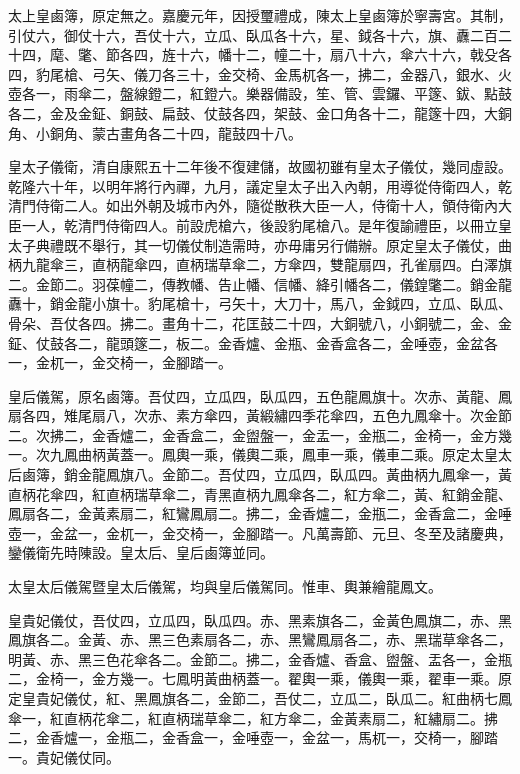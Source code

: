 \begin{pinyinscope}
太上皇鹵簿，原定無之。嘉慶元年，因授璽禮成，陳太上皇鹵簿於寧壽宮。其制，引仗六，御仗十六，吾仗十六，立瓜、臥瓜各十六，星、鉞各十六，旗、纛二百二十四，麾、氅、節各四，旌十六，幡十二，幢二十，扇八十六，傘六十六，戟殳各四，豹尾槍、弓矢、儀刀各三十，金交椅、金馬杌各一，拂二，金器八，銀水、火壺各一，雨傘二，盤線鐙二，紅鐙六。樂器備設，笙、管、雲鑼、平篴、鈸、點鼓各二，金及金鉦、銅鼓、扁鼓、仗鼓各四，架鼓、金口角各十二，龍篴十四，大銅角、小銅角、蒙古畫角各二十四，龍鼓四十八。

皇太子儀衛，清自康熙五十二年後不復建儲，故國初雖有皇太子儀仗，幾同虛設。乾隆六十年，以明年將行內禪，九月，議定皇太子出入內朝，用導從侍衛四人，乾清門侍衛二人。如出外朝及城市內外，隨從散秩大臣一人，侍衛十人，領侍衛內大臣一人，乾清門侍衛四人。前設虎槍六，後設豹尾槍八。是年復諭禮臣，以冊立皇太子典禮既不舉行，其一切儀仗制造需時，亦毋庸另行備辦。原定皇太子儀仗，曲柄九龍傘三，直柄龍傘四，直柄瑞草傘二，方傘四，雙龍扇四，孔雀扇四。白澤旗二。金節二。羽葆幢二，傳教幡、告止幡、信幡、絳引幡各二，儀鍠氅二。銷金龍纛十，銷金龍小旗十。豹尾槍十，弓矢十，大刀十，馬八，金鉞四，立瓜、臥瓜、骨朵、吾仗各四。拂二。畫角十二，花匡鼓二十四，大銅號八，小銅號二，金、金鉦、仗鼓各二，龍頭篴二，板二。金香爐、金瓶、金香盒各二，金唾壺，金盆各一，金杌一，金交椅一，金腳踏一。

皇后儀駕，原名鹵簿。吾仗四，立瓜四，臥瓜四，五色龍鳳旗十。次赤、黃龍、鳳扇各四，雉尾扇八，次赤、素方傘四，黃緞繡四季花傘四，五色九鳳傘十。次金節二。次拂二，金香爐二，金香盒二，金盥盤一，金盂一，金瓶二，金椅一，金方幾一。次九鳳曲柄黃蓋一。鳳輿一乘，儀輿二乘，鳳車一乘，儀車二乘。原定太皇太后鹵簿，銷金龍鳳旗八。金節二。吾仗四，立瓜四，臥瓜四。黃曲柄九鳳傘一，黃直柄花傘四，紅直柄瑞草傘二，青黑直柄九鳳傘各二，紅方傘二，黃、紅銷金龍、鳳扇各二，金黃素扇二，紅鸞鳳扇二。拂二，金香爐二，金瓶二，金香盒二，金唾壺一，金盆一，金杌一，金交椅一，金腳踏一。凡萬壽節、元旦、冬至及諸慶典，鑾儀衛先時陳設。皇太后、皇后鹵簿並同。

太皇太后儀駕暨皇太后儀駕，均與皇后儀駕同。惟車、輿兼繪龍鳳文。

皇貴妃儀仗，吾仗四，立瓜四，臥瓜四。赤、黑素旗各二，金黃色鳳旗二，赤、黑鳳旗各二。金黃、赤、黑三色素扇各二，赤、黑鸞鳳扇各二，赤、黑瑞草傘各二，明黃、赤、黑三色花傘各二。金節二。拂二，金香爐、香盒、盥盤、盂各一，金瓶二，金椅一，金方幾一。七鳳明黃曲柄蓋一。翟輿一乘，儀輿一乘，翟車一乘。原定皇貴妃儀仗，紅、黑鳳旗各二，金節二，吾仗二，立瓜二，臥瓜二。紅曲柄七鳳傘一，紅直柄花傘二，紅直柄瑞草傘二，紅方傘二，金黃素扇二，紅繡扇二。拂二，金香爐一，金瓶二，金香盒一，金唾壺一，金盆一，馬杌一，交椅一，腳踏一。貴妃儀仗同。


\end{pinyinscope}

